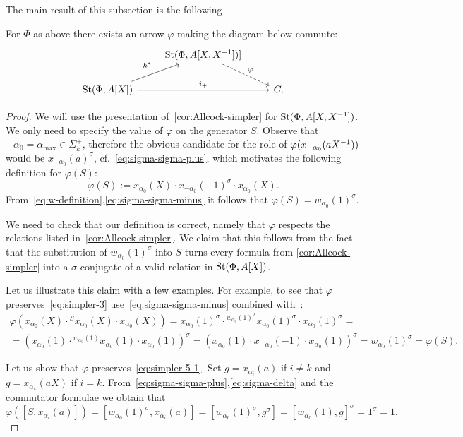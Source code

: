The main result of this subsection is the following
\begin{prop} \label{prop:rel-poly-Laurent}
    For $\Phi$ as above there exists an arrow $\varphi$ making the diagram below commute:
    \[\begin{tikzcd}           & \St(\Phi, A[X, X\inv]) \arrow[rd, dashrightarrow, "\varphi"]] & \\
    \St(\Phi, A[X]) \arrow{ru}{h_+^*} \arrow{rr}{i_+} &                                & G.
    \end{tikzcd}\]
\end{prop}
\begin{proof}
 We will use the presentation of~\cref{cor:Allcock-simpler} for $\operatorname{St}(\Phi, A[X, X^{-1}])$.
 We only need to specify the value of $\varphi$ on the generator $S$.
 Observe that $-\alpha_0 = \alpha_{\max} \in \Sigma_k^+$, therefore the obvious candidate for the role of $\varphi(x_{-\alpha_0}(aX^{-1}))$ would be $x_{-\alpha_0}(a)^\sigma$, cf.~\eqref{eq:sigma-sigma-plus},
 which motivates the following definition for $\varphi(S)$:
 \[\varphi(S) := x_{\alpha_0}(X) \cdot x_{-\alpha_0}(-1)^\sigma \cdot x_{\alpha_0}(X).\]
 From~\eqref{eq:w-definition},\eqref{eq:sigma-sigma-minus} it follows that $\varphi(S) = w_{\alpha_0}(1)^\sigma$.

 We need to check that our definition is correct, namely that $\varphi$ respects the relations listed in~\cref{cor:Allcock-simpler}.
 We claim that this follows from the fact that the substitution of $w_{\alpha_0}(1)^\sigma$ into $S$ turns every formula from \cref{cor:Allcock-simpler}
     into a $\sigma$-conjugate of a valid relation in $\operatorname{St}(\Phi, A[X])$.

 Let us illustrate this claim with a few examples.
 For example, to see that $\varphi$ preserves~\eqref{eq:simpler-3} use~\eqref{eq:sigma-sigma-minus} combined with~\cite[Lemma~5.1b]{Ma69}:
 \begin{multline*}
     \varphi(x_{\alpha_0}(X) \cdot {}^{S} x_{\alpha_0}(X) \cdot x_{\alpha_0}(X)) = x_{\alpha_0}(1)^\sigma \cdot {}^{w_{\alpha_0}(1)^\sigma} x_{\alpha_0}(1)^\sigma \cdot x_{\alpha_0}(1)^\sigma = \\
     = \left( x_{\alpha_0}(1) \cdot {}^{w_{\alpha_0}(1)} x_{\alpha_0}(1) \cdot x_{\alpha_0}(1)\right)^\sigma = \left(x_{\alpha_0}(1) \cdot x_{-\alpha_0}(-1) \cdot x_{\alpha_0}(1)\right)^\sigma = w_{\alpha_0}(1)^\sigma = \varphi(S).
 \end{multline*}

 Let us show that $\varphi$ preserves~\eqref{eq:simpler-5-1}.
 Set $g = x_{\alpha_i}(a)$ if $i \neq k$ and $g = x_{\alpha_k}(aX)$ if $i = k$.
 From~\eqref{eq:sigma-sigma-plus},\eqref{eq:sigma-delta} and the commutator formulae we obtain that
 \begin{equation*}
     \varphi([S, x_{\alpha_i}(a)]) = [w_{\alpha_0}(1)^\sigma, x_{\alpha_i}(a)] = [w_{\alpha_0}(1)^\sigma, g^\sigma] = [w_{\alpha_0}(1), g]^\sigma = 1^\sigma = 1.
 \end{equation*}


\end{proof}
